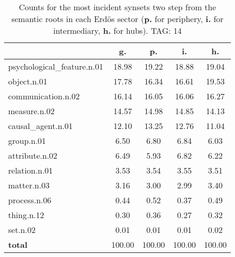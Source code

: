 \begin{table}[h!]
\begin{center}
\begin{tabular}{| l | c | c | c | c |}\hline
 & g. & p. & i. & h. \\\hline
psychological\_feature.n.01 & 18.98  & 19.22  & 18.88  & 19.04 \\\hline
object.n.01 & 17.78  & 16.34  & 16.61  & 19.53 \\\hline
communication.n.02 & 16.14  & 16.05  & 16.06  & 16.27 \\\hline
measure.n.02 & 14.57  & 14.98  & 14.85  & 14.13 \\\hline
causal\_agent.n.01 & 12.10  & 13.25  & 12.76  & 11.04 \\\hline
group.n.01 & 6.50  & 6.80  & 6.84  & 6.03 \\\hline
attribute.n.02 & 6.49  & 5.93  & 6.82  & 6.22 \\\hline
relation.n.01 & 3.53  & 3.54  & 3.55  & 3.51 \\\hline
matter.n.03 & 3.16  & 3.00  & 2.99  & 3.40 \\\hline
process.n.06 & 0.44  & 0.52  & 0.37  & 0.49 \\\hline
thing.n.12 & 0.30  & 0.36  & 0.27  & 0.32 \\\hline
set.n.02 & 0.01  & 0.01  & 0.01  & 0.02 \\\hline
{{\bf total}} & 100.00  & 100.00  & 100.00  & 100.00 \\\hline
\end{tabular}
\caption{Counts for the most incident synsets two step from the semantic roots in each Erd\"os sector ({\bf p.} for periphery, {\bf i.} for intermediary, {\bf h.} for hubs). TAG: 14}
\end{center}
\end{table}